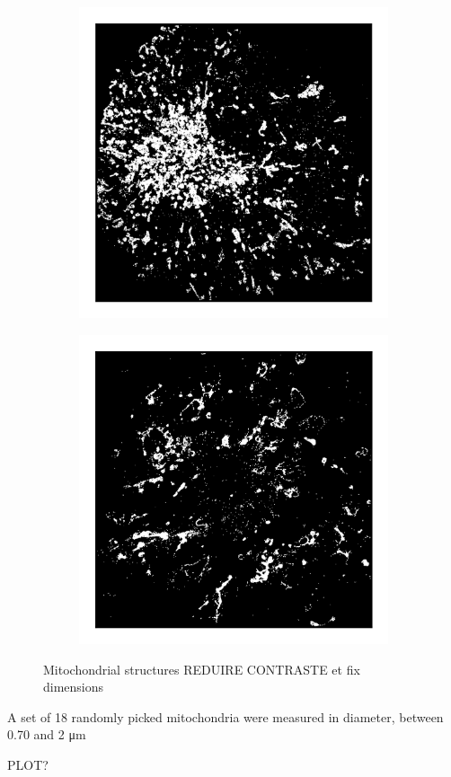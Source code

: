 \begin{figure}
\begin{subfigure}{0.32\textwidth}
        \caption{}
    \end{subfigure}
    \begin{subfigure}{0.32\textwidth}
        \includegraphics[width=\textwidth]{figures/mitochondria_image12.png}
        \caption{}
    \end{subfigure}
    \begin{subfigure}{0.32\textwidth}
        \includegraphics[width=\textwidth]{figures/mitochondria_image10.png}
        \caption{}
    \end{subfigure}
    \caption{Mitochondrial structures REDUIRE CONTRASTE et fix dimensions}
    \label{fig:mitochondria_images}
\end{figure}

A set of 18 randomly picked mitochondria were measured in diameter, between 0.70 and 2 \unit{\micro m}

PLOT?